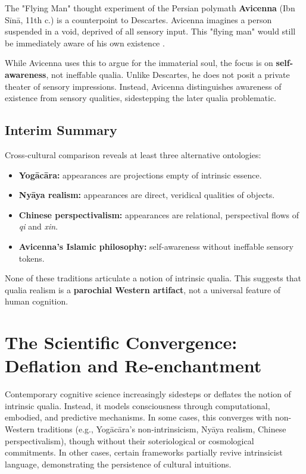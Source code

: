 \documentclass[11pt,a4paper]{article}
\begin{document}
The "Flying Man" thought experiment of the Persian polymath \textbf{Avicenna} (Ibn Sīnā, 11th c.) is a counterpoint to Descartes. Avicenna imagines a person suspended in a void, deprived of all sensory input. This "flying man" would still be immediately aware of his own existence \cite{adamson2016}.

While Avicenna uses this to argue for the immaterial soul, the focus is on \textbf{self-awareness}, not ineffable qualia. Unlike Descartes, he does not posit a private theater of sensory impressions. Instead, Avicenna distinguishes awareness of existence from sensory qualities, sidestepping the later qualia problematic.

\subsection{Interim Summary}

Cross-cultural comparison reveals at least three alternative ontologies:

\begin{itemize}
\item \textbf{Yogācāra:} appearances are projections empty of intrinsic essence.
\item \textbf{Nyāya realism:} appearances are direct, veridical qualities of objects.
\item \textbf{Chinese perspectivalism:} appearances are relational, perspectival flows of \emph{qi} and \emph{xin}.
\item \textbf{Avicenna's Islamic philosophy:} self-awareness without ineffable sensory tokens.
\end{itemize}

None of these traditions articulate a notion of intrinsic qualia. This suggests that qualia realism is a \textbf{parochial Western artifact}, not a universal feature of human cognition.

\section{The Scientific Convergence: Deflation and Re-enchantment}

Contemporary cognitive science increasingly sidesteps or deflates the notion of intrinsic qualia. Instead, it models consciousness through computational, embodied, and predictive mechanisms. In some cases, this converges with non-Western traditions (e.g., Yogācāra's non-intrinsicism, Nyāya realism, Chinese perspectivalism), though without their soteriological or cosmological commitments. In other cases, certain frameworks partially revive intrinsicist language, demonstrating the persistence of cultural intuitions.
\end{document}
